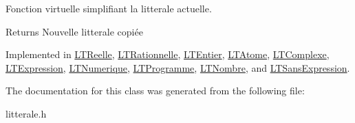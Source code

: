 Fonction virtuelle simplifiant la litterale actuelle. 

\begin{DoxyReturn}{Returns}
Nouvelle litterale copiée 
\end{DoxyReturn}


Implemented in \hyperlink{class_l_t_reelle_aaaf23323d16d13b2ec7595c6aa07935f}{L\+T\+Reelle}, \hyperlink{class_l_t_rationnelle_afefcccb71e7fd20491e8f14aef88dd6e}{L\+T\+Rationnelle}, \hyperlink{class_l_t_entier_a3dd0959762240ef5cbe0a62970728ddf}{L\+T\+Entier}, \hyperlink{class_l_t_atome_a2e2cee64c687ab8c648e4866ab1150b8}{L\+T\+Atome}, \hyperlink{class_l_t_complexe_aa4781a2130c4dd2daa81fde8caa6fff3}{L\+T\+Complexe}, \hyperlink{class_l_t_expression_a8817e6f26189ad7a4e65bd24f6020367}{L\+T\+Expression}, \hyperlink{class_l_t_numerique_a3963de62916188d01f93b1d0fdb42c7f}{L\+T\+Numerique}, \hyperlink{class_l_t_programme_a7bfe6b6140e56fc578ed5dce2e2d9ea5}{L\+T\+Programme}, \hyperlink{class_l_t_nombre_a6aa1593c8c0956bb5412bfee3c15b085}{L\+T\+Nombre}, and \hyperlink{class_l_t_sans_expression_a13982a6a4f155bac50a0058a2c352e91}{L\+T\+Sans\+Expression}.



The documentation for this class was generated from the following file\+:\begin{DoxyCompactItemize}
\item 
litterale.\+h\end{DoxyCompactItemize}
